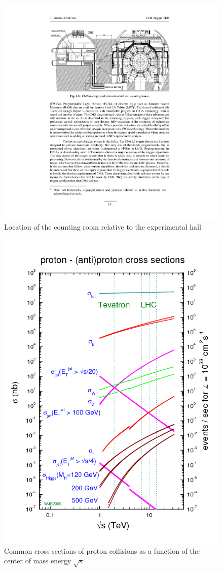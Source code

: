 {\begin{figure}
\begin{center}
\includegraphics[width=.95\textwidth]{pics/counting_room}
\caption{Location of the counting room relative to the experimental hall}
\end{center}
\label{fig:counting_room}
\end{figure}

\begin{figure}
\begin{center}
\includegraphics[width=.5\textwidth]{figures/exp_proj/pdf_xsec.png}
\caption{Common cross sections of proton collisions as a function of the center of mass energy $\sqrt{s}$}
\end{center}
\label{fig:pdf_xsec}
\end{figure}

}
